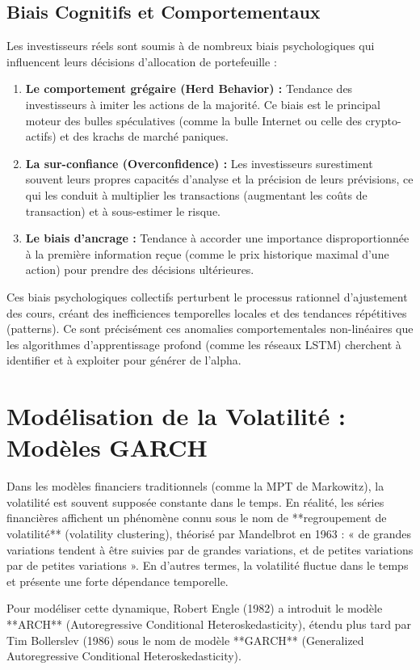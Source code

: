 \subsection{Biais Cognitifs et Comportementaux}
Les investisseurs réels sont soumis à de nombreux biais psychologiques qui influencent leurs décisions d'allocation de portefeuille :
\begin{enumerate}
    \item \textbf{Le comportement grégaire (Herd Behavior) :} Tendance des investisseurs à imiter les actions de la majorité. Ce biais est le principal moteur des bulles spéculatives (comme la bulle Internet ou celle des crypto-actifs) et des krachs de marché paniques.
    \item \textbf{La sur-confiance (Overconfidence) :} Les investisseurs surestiment souvent leurs propres capacités d'analyse et la précision de leurs prévisions, ce qui les conduit à multiplier les transactions (augmentant les coûts de transaction) et à sous-estimer le risque.
    \item \textbf{Le biais d'ancrage :} Tendance à accorder une importance disproportionnée à la première information reçue (comme le prix historique maximal d'une action) pour prendre des décisions ultérieures.
\end{enumerate}

Ces biais psychologiques collectifs perturbent le processus rationnel d'ajustement des cours, créant des inefficiences temporelles locales et des tendances répétitives (patterns). Ce sont précisément ces anomalies comportementales non-linéaires que les algorithmes d'apprentissage profond (comme les réseaux LSTM) cherchent à identifier et à exploiter pour générer de l'alpha.

\section{Modélisation de la Volatilité : Modèles GARCH}
Dans les modèles financiers traditionnels (comme la MPT de Markowitz), la volatilité est souvent supposée constante dans le temps. En réalité, les séries financières affichent un phénomène connu sous le nom de **regroupement de volatilité** (volatility clustering), théorisé par Mandelbrot en 1963 : « de grandes variations tendent à être suivies par de grandes variations, et de petites variations par de petites variations ». En d'autres termes, la volatilité fluctue dans le temps et présente une forte dépendance temporelle.

Pour modéliser cette dynamique, Robert Engle (1982) a introduit le modèle **ARCH** (Autoregressive Conditional Heteroskedasticity), étendu plus tard par Tim Bollerslev (1986) sous le nom de modèle **GARCH** (Generalized Autoregressive Conditional Heteroskedasticity).

